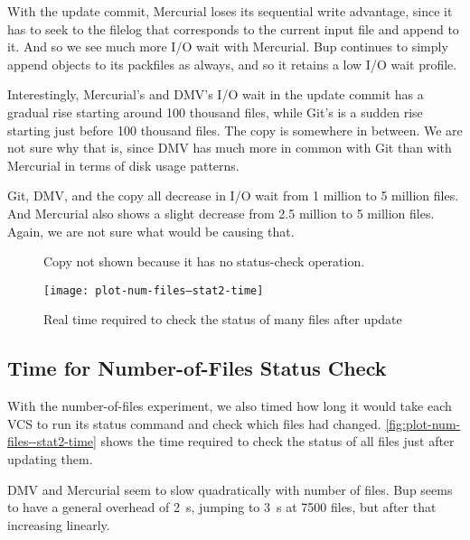 With the update commit, Mercurial loses its sequential write advantage, since it
has to seek to the \gls{filelog} that corresponds to the current input file and
append to it. And so we see much more I/O wait with Mercurial. Bup continues to
simply append objects to its \glspl{packfile} as always, and so it retains a low
I/O wait profile.

Interestingly, Mercurial's and \gls{DMV}'s I/O wait in the update commit has a
gradual rise starting around 100 thousand files, while Git's is a sudden rise
starting just before 100 thousand files. The copy is somewhere in between. We
are not sure why that is, since \gls{DMV} has much more in common with Git than
with Mercurial in terms of disk usage patterns.

Git, \gls{DMV}, and the copy all decrease in I/O wait from \num{1} million to
\num{5} million files. And Mercurial also shows a slight decrease from \num{2.5}
million to \num{5} million files. Again, we are not sure what would be causing
that.

%


\begin{figure}[p]
    \begin{leftfullpage}
        \caption{Real time required to check the status of many files after
        update}
        \label{fig:plot-num-files--stat2-time}
        \centering

        \explainlogsubfig

        Copy not shown because it has no status-check operation.

        \texttt{[image: plot-num-files--stat2-time]}
    \end{leftfullpage}
\end{figure}

\cleardoublepage

\subsection{Time for Number-of-Files Status Check}

With the number-of-files experiment, we also timed how long it would take each
\gls{VCS} to run its status command and check which files had changed.
\autoref{fig:plot-num-files--stat2-time} shows the time required to check the
status of all files just after updating them.

\gls{DMV} and Mercurial seem to slow quadratically with number of files. Bup
seems to have a general overhead of \SI{2}{\second}, jumping to \SI{3}{\second}
at \num{7500} files, but after that increasing linearly.

